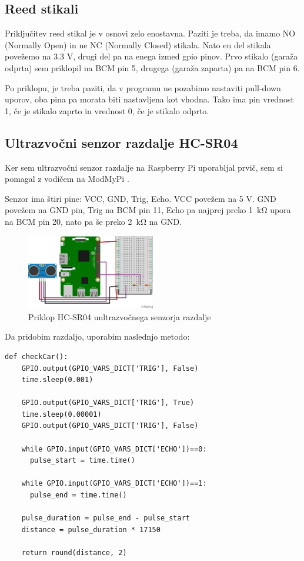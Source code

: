 \documentclass[11pt]{article}
\begin{document}
\subsection{Reed stikali}
Priključitev reed stikal je v osnovi zelo enostavna. Paziti je treba, da imamo NO (Normally Open) in ne NC (Normally Closed) stikala. Nato en del stikala povežemo na 3.3 V, drugi del pa na enega izmed \gls{gpio} pinov. Prvo stikalo (garaža odprta) sem priklopil na BCM pin 5, drugega (garaža zaparta) pa na BCM pin 6.

Po priklopu, je treba paziti, da v programu ne pozabimo nastaviti pull-down uporov, oba pina pa morata biti nastavljena kot vhodna. Tako ima pin vrednost 1, če je stikalo zaprto in vrednost 0, če je stikalo odprto.

\subsection{Ultrazvočni senzor razdalje HC-SR04}
Ker sem ultrazvočni senzor razdalje na Raspberry Pi uporabljal prvič, sem si pomagal z vodičem na ModMyPi \cite{ModMyPi_us}.

Senzor ima štiri pine: VCC, GND, Trig, Echo. VCC povežem na 5 V. GND povežem na GND pin, Trig na BCM pin 11, Echo pa najprej preko \SI{1}{\kohm} upora na BCM pin 20, nato pa še preko \SI{2}{\kohm} na GND.
\begin{figure}[h]
\centering
\includegraphics[width=0.5\textwidth]{images/smartGarage_Distance_bb.png}
\caption{Priklop HC-SR04 unltrazvočnega senzorja razdalje}
\end{figure}
\newpage
Da pridobim razdaljo, uporabim naslednjo metodo:
\begin{verbatim}
def checkCar():
    GPIO.output(GPIO_VARS_DICT['TRIG'], False)
    time.sleep(0.001)

    GPIO.output(GPIO_VARS_DICT['TRIG'], True)
    time.sleep(0.00001)
    GPIO.output(GPIO_VARS_DICT['TRIG'], False)

    while GPIO.input(GPIO_VARS_DICT['ECHO'])==0:
      pulse_start = time.time()

    while GPIO.input(GPIO_VARS_DICT['ECHO'])==1:
      pulse_end = time.time()

    pulse_duration = pulse_end - pulse_start
    distance = pulse_duration * 17150

    return round(distance, 2)
\end{verbatim}
\end{document}
